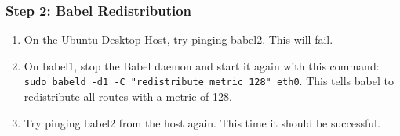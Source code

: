 \documentclass[main.tex]{subfiles}
\begin{document}
\subsubsection{Step 2: Babel Redistribution} 
\begin{enumerate}[noitemsep,label=$\bullet$,leftmargin=20mm,labelsep=0.5cm]

\item On the Ubuntu Desktop Host, try pinging babel2. This will fail.


\item On babel1, stop the Babel daemon and start it again with this command: \texttt{sudo babeld -d1 -C "redistribute metric 128" eth0}. This tells babel to redistribute all routes with a metric of 128. 

\item Try pinging babel2 from the host again. This time it should be successful. 


\end{enumerate}
\end{document}
